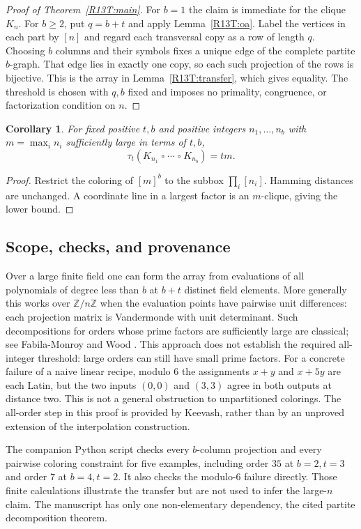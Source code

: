 \documentclass[11pt,a4paper]{article}
\newtheorem{SourceRbdTcorollary}[SourceRbdTtheorem]{Corollary}
\begin{document}
\begin{proof}[Proof of Theorem~\ref{R13T:main}]
For $b=1$ the claim is immediate for the clique $K_n$. For $b\ge2$, put $q=b+t$ and apply Lemma~\ref{R13T:oa}. Label the vertices in each part by $[n]$ and regard each transversal copy as a row of length $q$. Choosing $b$ columns and their symbols fixes a unique edge of the complete partite $b$-graph. That edge lies in exactly one copy, so each such projection of the rows is bijective. This is the array in Lemma~\ref{R13T:transfer}, which gives equality. The threshold is chosen with $q,b$ fixed and imposes no primality, congruence, or factorization condition on $n$.
\end{proof}

\begin{SourceRbdTcorollary}
For fixed positive $t,b$ and positive integers $n_1,\ldots,n_b$ with $m=\max_i n_i$ sufficiently large in terms of $t,b$,
\[
 \tau_t(K_{n_1}\mathbin{\square}\cdots\mathbin{\square}K_{n_b})=tm.
\]
\end{SourceRbdTcorollary}
\begin{proof}
Restrict the coloring of $[m]^b$ to the subbox $\prod_i[n_i]$. Hamming distances are unchanged. A coordinate line in a largest factor is an $m$-clique, giving the lower bound.
\end{proof}

\subsection{Scope, checks, and provenance}
Over a large finite field one can form the array from evaluations of all polynomials of degree less than $b$ at $b+t$ distinct field elements. More generally this works over $\mathbb Z/n\mathbb Z$ when the evaluation points have pairwise unit differences: each projection matrix is Vandermonde with unit determinant. Such decompositions for orders whose prime factors are sufficiently large are classical; see Fabila-Monroy and Wood \cite{R13T:FMW}. This approach does not establish the required all-integer threshold: large orders can still have small prime factors. For a concrete failure of a naive linear recipe, modulo $6$ the assignments $x+y$ and $x+5y$ are each Latin, but the two inputs $(0,0)$ and $(3,3)$ agree in both outputs at distance two. This is not a general obstruction to unpartitioned colorings. The all-order step in this proof is provided by Keevash, rather than by an unproved extension of the interpolation construction.

The companion Python script checks every $b$-column projection and every pairwise coloring constraint for five examples, including order $35$ at $b=2,t=3$ and order $7$ at $b=4,t=2$. It also checks the modulo-$6$ failure directly. Those finite calculations illustrate the transfer but are not used to infer the large-$n$ claim. The manuscript has only one non-elementary dependency, the cited partite decomposition theorem.
\end{document}
